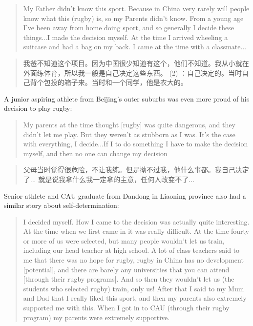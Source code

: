 \begin{CJK}{UTF8}{gbsn}
  \begin{quotation}
    My Father didn't know this sport.  Because in China very rarely will people know what this (rugby) is, so my Parents didn't know. From a young age I've been away from home doing sport, and so generally I decide these things...I made the decision myself.  At the time I arrived wheeling a suitcase and had a bag on my back.  I came at the time with a classmate...
  \end{quotation}


    \begin{quotation}
      我爸不知道这个项目。因为中国很少知道有这个，他们不知道。我从小就在外面练体育，所以我一般是自己决定这些东西。 (2) ：自己决定的。当时自己背个包投的箱子来。当时和一个同学，他是农大的。
    \end{quotation}


  A junior aspiring athlete from Beijing's outer suburbs was even more proud of his decision to play rugby:
  \begin{quotation}
    My parents at the time thought [rugby] was quite dangerous, and they didn't let me play.  But they weren't as stubborn as I was.  It's the case with everything, I decide...If I to do something I have to make the decision myself, and then no one can change my decision
  \end{quotation}


    \begin{quotation}
      父母当时觉得很危险，不让我练。但是拗不过我，他什么事都。我自己决定了...
      就是说我拿什么我一定拿的主意，任何人改变不了...
    \end{quotation}



  Senior athlete and CAU graduate from Dandong in Liaoning province also had a similar story about self-determination:

  \begin{quotation}
    I decided myself. How I came to the decision was actually quite interesting.  At the time when we first came in it was really difficult.  At the time fourty or more of us were selected, but many people wouldn't let us train, including our head teacher at high school.  A lot of class teachers said to me that there was no hope for rugby, rugby in China has no development [potential], and there are barely any universities that you can attend [through their rugby programs].  And so then they wouldn't let us (the students who selected rugby) train, only us! After that I said to my Mum and Dad that I really liked this sport, and then my parents also extremely supported me with this.  When I got in to CAU (through their rugby program) my parents were extremely supportive.
  \end{quotation}



\end{CJK}
